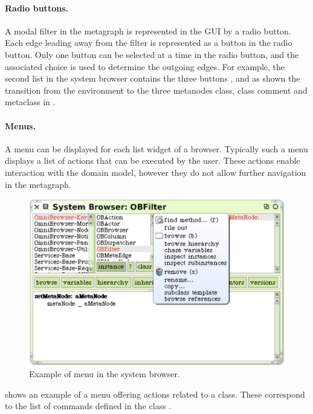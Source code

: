 \documentclass[a4paper,10pt,twoside]{book}
\begin{document}
\paragraph{Radio buttons.} A modal filter in the metagraph is represented in the GUI by a radio button. Each edge leading away from the filter is represented as a button in the radio button. Only one button can be selected at a time in the radio button, and the associated choice is used to determine the outgoing edges. For example, the second list in the system browser contains the three buttons ,  and  as shown the transition from the environment to the three metanodes class, class comment and metaclass in .

\paragraph{Menus.} A menu can be displayed for each list widget of a browser. Typically such a menu displays a list of actions that can be executed by the user. These actions enable interaction with the domain model, however they do not allow further navigation in the metagraph.

\begin{figure}[!ht]
\begin{center}
\includegraphics[scale=0.65]{menu.pdf}
\caption{Example of menu in the \obf system browser.} 
\end{center}
\end{figure}

 shows an example of a menu offering actions related to a class. These correspond to the list of commands defined in the class .
\end{document}
